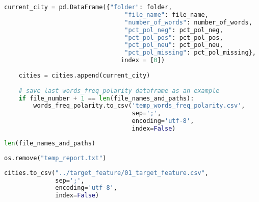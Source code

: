 \begin{lstlisting}[language=Python]
    current_city = pd.DataFrame({"folder": folder,
                                 "file_name": file_name,
                                 "number_of_words": number_of_words,
                                 "pct_pol_neg": pct_pol_neg,
                                 "pct_pol_pos": pct_pol_pos,
                                 "pct_pol_neu": pct_pol_neu,
                                 "pct_pol_missing": pct_pol_missing},
                                index = [0])
    
    cities = cities.append(current_city)
    
    # save last words_freq_polarity dataframe as an example
    if file_number + 1 == len(file_names_and_paths):
        words_freq_polarity.to_csv('temp_words_freq_polarity.csv',
                                   sep=';',
                                   encoding='utf-8',
                                   index=False)
\end{lstlisting}

\begin{lstlisting}[language=Python]
len(file_names_and_paths)
\end{lstlisting}

\begin{lstlisting}[language=Python]
os.remove("temp_report.txt")
\end{lstlisting}

\begin{lstlisting}[language=Python]
cities.to_csv("../target_feature/01_target_feature.csv",
              sep=';',
              encoding='utf-8',
              index=False)
\end{lstlisting}

